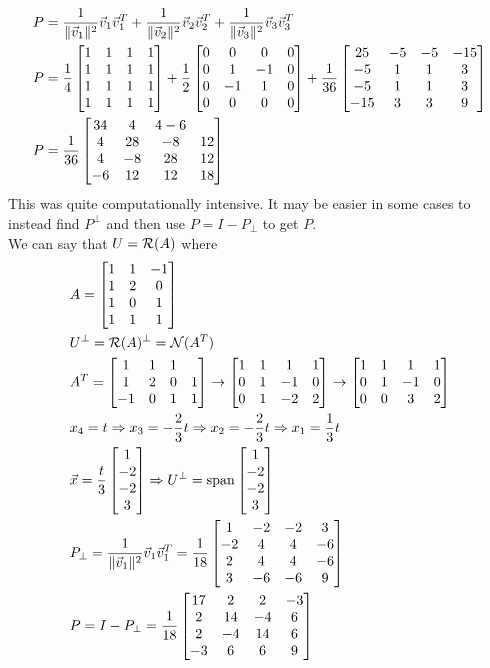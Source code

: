 \documentclass[11pt, fleqn]{article}
\begin{document}
\begin{align*}
    &P=\frac{1}{\|\vec{v}_1\|^2}\vec{v}_1\vec{v}_1^T+\frac{1}{\|\vec{v}_2\|^2}\vec{v}_2\vec{v}_2^T+\frac{1}{\|\vec{v}_3\|^2}\vec{v}_3\vec{v}_3^T\\
    &P=\frac{1}{4}\matrixx{1 & 1& 1 & 1\\ 1 & 1 & 1 & 1\\ 1 & 1 & 1 & 1\\ 1 & 1 & 1 & 1}+\frac{1}{2}\matrixx{0 & 0 & 0 & 0\\ 0 & 1 & -1 & 0\\ 0 & -1 & 1 & 0\\ 0 & 0 & 0 & 0}+\frac{1}{36}\matrixx{25 & -5 & -5 & -15\\ -5 & 1 & 1 & 3\\ -5 & 1 & 1 & 3\\ -15 & 3 & 3 & 9}\\
    &P=\frac{1}{36}\matrixx{34 & 4 & 4 -6\\ 4 & 28 & -8 & 12\\ 4 & -8 & 28 & 12\\ -6 & 12 & 12 & 18}
\end{align*}
This was quite computationally intensive. It may be easier in some cases to instead find $P^\perp$ and then use $P=I-P_\perp$ to get $P$.\\
We can say that $U=\mathcal{R}(A)$ where
\begin{align*}
    &A=\matrixx{1 & 1 & -1\\ 1& 2 & 0\\ 1 & 0 & 1\\ 1 & 1 & 1}\\
    &U^\perp=\Range(A)^\perp=\Null(A^T)\\
    &A^T=\matrixx{1 & 1 & 1 &\\ 1 & 2 & 0 & 1\\ -1 & 0 & 1 & 1}\to\matrixx{1 & 1 & 1 & 1\\ 0 & 1 & -1 & 0\\ 0 & 1 & -2 & 2}\to \matrixx{1 & 1 & 1 & 1\\ 0 & 1 & -1 & 0\\ 0 & 0 & 3 & 2}\\
    &x_4=t\Ra x_3=-\frac{2}{3}t\Ra x_2=-\frac{2}{3}t\Ra x_1=\frac{1}{3}t\\
    &\vec{x}=\frac{t}{3}\matrixx{1\\-2\\-2\\3}\Ra U^\perp=\spann\matrixx{1\\-2\\-2\\3}\\
    &P_\perp=\frac{1}{\|\vec{v}_1\|^2}\vec{v}_1\vec{v}_1^T=\frac{1}{18}\matrixx{1 & -2 & -2 & 3\\ -2 & 4 & 4 & -6\\ 2 & 4 & 4 & -6\\ 3 & -6 & -6 & 9}\\
    &P=I-P_\perp=\frac{1}{18}\matrixx{17 & 2 & 2 & -3\\ 2 & 14 & -4 & 6\\ 2 & -4 & 14 & 6\\ -3 & 6 & 6 & 9}
\end{align*}
\end{document}
